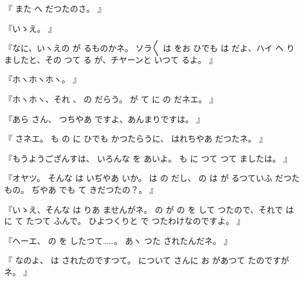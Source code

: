 『
また
へ
だつたのさ。
』

『いゝえ。
』

『なに、いヽえの
が
るものかネ。
ソラ〳〵
は
をお
ひでも
は
だよ、ハイ
へ
りましたと、その
つて
る
が、チヤーンと
いつて
るよ。
』

『ホヽホヽホヽ。
』

『ホヽホヽ、それ
、
の
だらう。
が
て
に
の
だネエ。
』

『あら
さん、
つちやあ
ですよ、あんまりですは。
』

『
さネエ。
も
の
に
ひでも
かつたらうに、
はれちやあ
だつたネ。
』

『もうようござんすは、
いろんな
を
あいよ。
も
に
つて
つて
ましたは。
』

『オヤツ。
そんな
は
いぢやあ
いか。
は
の
だし、
の
は
が
るつていふ
だつたもの。
ぢやあ
でも
て
きだつたの？。
』

『いゝえ、そんな
は
りあ
ませんがネ。
の
が
の
を
して
つたので、それで
は
に
て
たつて
ふんで。
ひよつくりと
で
つたわけなのですよ。
』

『ヘーエ、
の
を
したつて……。
あヽ
つた
されたんだネ。
』

『
なのよ、
は
されたのですつて。
について
さんに
お
があつて
たのですがネ。
』

